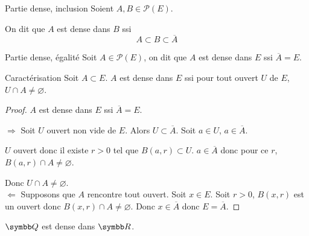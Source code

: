 \begin{definition}{Partie dense, inclusion}{}
    Soient $A, B \in \mathscr P(E)$.

    On dit que $A$ est dense dans $B$ ssi 
    \[A \subset B \subset \overline A\]
\end{definition}

\begin{definition}{Partie dense, égalité}{}
    Soit $A \in \mathscr P(E)$, on dit que $A$ est dense dans $E$ ssi $\overline A = E$.
\end{definition}

\begin{proposition}{Caractérisation}{}
    Soit $A \subset E$. $A$ est  dense dans $E$ ssi pour tout ouvert $U$ de $E$, $U \cap A \not \equal \varnothing$.     
\end{proposition}

\begin{proof}
$A$ est dense dans $E$ ssi $\overline A = E$.

$\Rightarrow$ Soit $U$ ouvert non vide de $E$.
Alors $U \subset \overline A$.
Soit $a \in U$, $a \in \overline A$.

$U$ ouvert donc il existe $r > 0$ tel que $B(a,r) \subset U$.
$a \in \overline A$ donc pour ce $r$, $B(a,r) \cap A \not \equal \varnothing$.

Donc $U \cap A \not \equal \varnothing$. \\

$\Leftarrow$ Supposons que $A$ rencontre tout ouvert.
Soit $x \in E$. Soit $r > 0$, $B(x,r)$ est un ouvert donc $B(x,r) \cap A \not \equal \varnothing$.
Donc $x \in \overline A$ donc $E = \overline A$.
\end{proof}

\begin{exemple}
    $\Q$ est dense dans $\R$.
\end{exemple}

